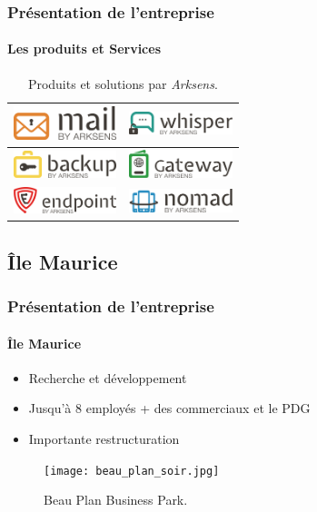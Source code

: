 \documentclass{beamer}
\begin{document}
\begin{frame}
  \frametitle{Présentation de l'entreprise}
  \framesubtitle{Les produits et Services}
  \begin{table}[h!]
    \centering
    \def\arraystretch{1.5}
    \setlength{\fboxsep}{13pt} %
    \setlength{\fboxrule}{0pt} %
    \begin{tabular}{cc}
      \arrayrulecolor{gray73}
      \includegraphics[width=3cm, fbox]{produits/mail.png} & 
      \includegraphics[width=3cm, fbox]{produits/whisper.png}\\
      \hline
      \includegraphics[width=3cm, fbox]{produits/backup.png} &
      \includegraphics[width=3cm, fbox]{produits/gateway.png}\\
      \hline
      \includegraphics[width=3cm, fbox]{produits/endpoint.png} &
      \includegraphics[width=3cm, fbox]{produits/nomad.png}\\
    \end{tabular}
    \caption{Produits et solutions par \textit{Arksens}.}
  \end{table}
\end{frame}

\subsection{Île Maurice}
\begin{frame}
  \frametitle{Présentation de l'entreprise}
  \framesubtitle{Île Maurice}
  \begin{minipage}{0.49\linewidth}
    \begin{itemize}
     \item Recherche et développement
     \item Jusqu'à 8 employés + des commerciaux et le PDG
     \item Importante restructuration
    \end{itemize}
  \end{minipage}
  \begin{minipage}{0.49\linewidth}
    \begin{figure}[h!]
      \centering
      \texttt{[image: beau\_plan\_soir.jpg]}
      \caption{Beau Plan Business Park.}
    \end{figure}
  \end{minipage}
\end{frame}
\end{document}
